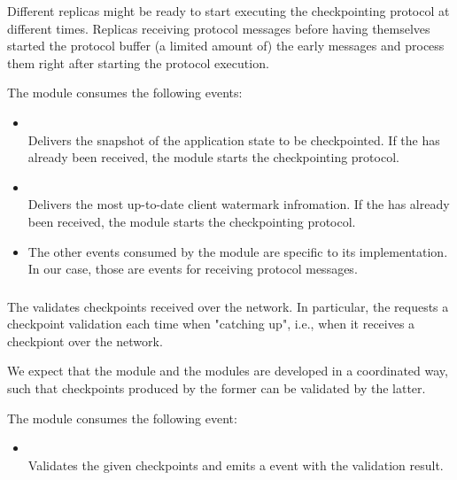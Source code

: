 \documentclass{article}
\begin{document}
Different replicas might be ready to start executing the checkpointing protocol at different times.
Replicas receiving protocol messages before having themselves started the protocol buffer (a limited amount of) the early messages
and process them right after starting the protocol execution.

The  module consumes the following events:

\begin{itemize}
    \item {}\\
    Delivers the snapshot of the application state to be checkpointed.
    If the  has already been received, the module starts the checkpointing protocol.
    
    \item {}\\
    Delivers the most up-to-date client watermark infromation.
    If the  has already been received, the module starts the checkpointing protocol.

    \item The other events consumed by the  module are specific to its implementation.
    In our case, those are events for receiving protocol messages.
\end{itemize}

\subsubsection{}

The  validates checkpoints received over the network.
In particular, the  requests a checkpoint validation each time when "catching up",
i.e., when it receives a checkpiont over the network.

We expect that the  module and the  modules are developed in a coordinated way,
such that checkpoints produced by the former can be validated by the latter.

The  module consumes the following event:

\begin{itemize}

    \item {}\\
    Validates the given checkpoints and emits a  event with the validation result.
    
\end{itemize}
\end{document}

